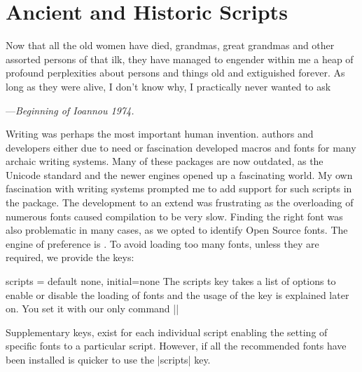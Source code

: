 
\pagestyle{headings}

\chapter{Ancient and Historic Scripts}

\epigraph{Now that all the old women have died, grandmas, great grandmas and other
assorted persons of that ilk, they have managed to engender within me a heap of
profound perplexities about persons and things old and extiguished forever. As long
as they were alive, I don't know why, I practically never wanted to ask}{---\textit{Beginning of Ioannou 1974.}}

Writing was perhaps the most important human invention. \tex authors and developers either due to need or fascination developed macros and fonts for many archaic writing systems. Many of these packages are now outdated, as the Unicode standard and the newer engines opened up a fascinating world. My own fascination with writing systems prompted me to add support for such scripts in the  package. The development to an extend was frustrating as the overloading of numerous fonts caused compilation to be very slow. Finding the right font was also problematic in many cases, as we opted to identify Open Source fonts. The \tex engine of preference is \luatex. To avoid loading too many fonts, unless they are required, we provide the keys:

\def\loadscripts{}
\cxset{scripts/.store in = \loadscripts}

\begin{docKey}[phd]{scripts}{ = } {default none, initial=none}
 The scripts key takes a list of options to enable or disable the loading of fonts and the usage of the key is explained later on. You set it with our only command |\cxset|
\end{docKey}

Supplementary keys, exist for each individual script enabling the setting of specific fonts to a particular script. However, if all the recommended fonts have been installed is quicker to use the |scripts| key.

